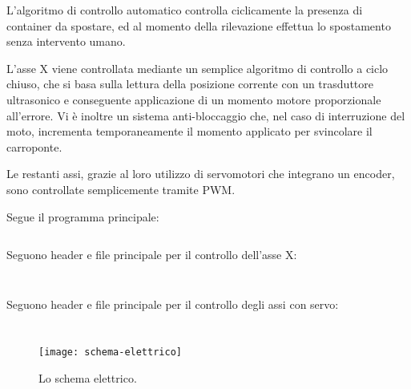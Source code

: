L'algoritmo di controllo automatico controlla ciclicamente la presenza di container da spostare, ed
al momento della rilevazione effettua lo spostamento senza intervento umano. 

L'asse X viene controllata mediante un semplice algoritmo di controllo a ciclo chiuso, che si basa
sulla lettura della posizione corrente con un trasduttore ultrasonico e conseguente applicazione di
un momento motore proporzionale all'errore. Vi è inoltre un sistema anti-bloccaggio che, nel caso di
interruzione del moto, incrementa temporaneamente il momento applicato per svincolare il carroponte.

Le restanti assi, grazie al loro utilizzo di servomotori che integrano un encoder, sono controllate
semplicemente tramite PWM.

Segue il programma principale:
\inputminted{cpp}{../ProgrammaPrincipale/ProgrammaPrincipale.ino}

Seguono header e file principale per il controllo dell'asse X:
\inputminted{cpp}{../ProgrammaPrincipale/AsseX.hpp}
\inputminted{cpp}{../ProgrammaPrincipale/AsseX.cpp}

Seguono header e file principale per il controllo degli assi con servo:
\inputminted{cpp}{../ProgrammaPrincipale/AsseServo.hpp}
\inputminted{cpp}{../ProgrammaPrincipale/AsseServo.cpp}

\begin{figure*}[htbp]\centering
    \texttt{[image: schema-elettrico]}
    \caption{Lo schema elettrico.}
\end{figure*}

\printbibliography


